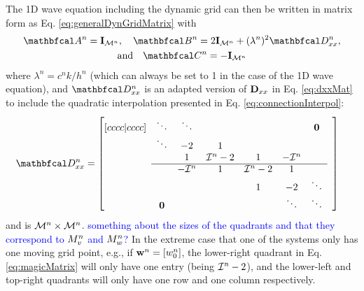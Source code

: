 \documentclass[fleqn]{jaes}
\def\SWcomment[#1]{\textcolor{blue}{#1}}
\begin{document}
The 1D wave equation including the dynamic grid can then be written in matrix form as Eq. \eqref{eq:generalDynGridMatrix} with
\begin{equation}\label{eq:1DwaveDynMatrix}
\begin{gathered}
    \AA = \I_{\MoneD}, \quad \BB = 2\I_\MoneD + (\lambda^n)^2\DDxx,\\
\text{and} \quad\CC = -\I_{\MoneD}
\end{gathered}
\end{equation}
where $\lambda^n = c^nk/h^n$ (which can always be set to 1 in the case of the 1D wave equation), and $\DDxx$ is an adapted version of $\mathbf{D}_{xx}$ in Eq. \eqref{eq:dxxMat} to include the quadratic interpolation presented in Eq. \eqref{eq:connectionInterpol}:
\begin{equation}\label{eq:magicMatrix}
    \!\!\!\!\!\!\DDxx = \begin{bmatrix}[cccc|cccc]
     & \ddots  &\ddots & & & & \mathbf{0} & \\
       & \ddots & -2 & 1 & & & & \\
      & & 1 & \Aterm -2 & 1 & -\Aterm & \\ \cline{2-7}
      & & -\Aterm & 1 & \Aterm -2 & 1 & & \\
         & & & &1 & -2 & \ddots  \\
         & \mathbf{0} & &  &  &\ddots & \ddots &
    \end{bmatrix}
\end{equation}
and is ${\mathcal{M}^n} \times {\mathcal{M}^n}$. \SWcomment[something about the sizes of the quadrants and that they correspond to $M_v^n$ and $M_w^n$?] In the extreme case that one of the systems only has one moving grid point, e.g., if $\mathbf{w}^n =[w_0^n]$, the lower-right quadrant in Eq. \eqref{eq:magicMatrix} will only have one entry (being $\mathcal{I}^n-2$), and the lower-left and top-right quadrants will only have one row and one column respectively. 
\end{document}
